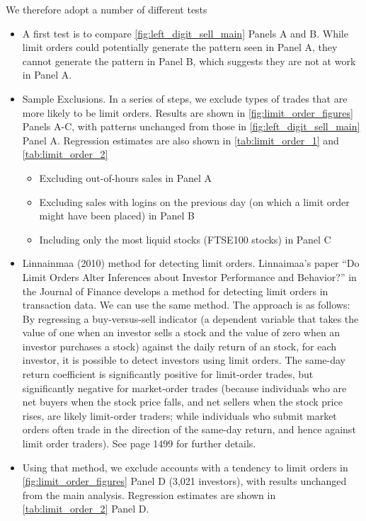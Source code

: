 We therefore adopt a number of different tests 
\begin{itemize}
	\item A first test is to compare \ref{fig:left_digit_sell_main} Panels A and B. While limit orders could potentially generate the pattern seen in Panel A, they cannot generate the pattern in Panel B, which suggests they are not at work in Panel A.
	\item Sample Exclusions. In a series of steps, we exclude types of trades that are more likely to be limit orders. Results are shown in \ref{fig:limit_order_figures} Panels A-C, with patterns unchanged from those in \ref{fig:left_digit_sell_main} Panel A. Regression estimates are also shown in \ref{tab:limit_order_1} and \ref{tab:limit_order_2}
	\begin{itemize}
		\item Excluding out-of-hours sales in Panel A
		\item Excluding sales with logins on the previous day (on which a limit order might have been placed) in Panel B
		\item Including only the most liquid stocks (FTSE100 stocks) in Panel C
	\end{itemize} 
	\item Linnainmaa (2010) method for detecting limit orders. Linnaimaa's paper ``Do Limit Orders Alter Inferences about Investor Performance and Behavior?'' in the Journal of Finance develops a method for detecting limit orders in transaction data. We can use the same method. The approach is as follows: By regressing a buy-versus-sell indicator (a dependent variable that takes the value of one when an investor sells a stock and the value of zero when an investor purchases a stock) against the daily return of an stock, for each investor, it is possible to detect investors using limit orders. The same-day return coefficient is significantly positive for limit-order trades, but significantly negative for market-order trades (because individuals who are net buyers when the stock price falls, and net sellers when the stock price rises, are likely limit-order traders; while individuals who submit market orders often trade in the direction of the same-day return, and hence against limit order traders). See page 1499 for further details.
	\item Using that method, we exclude accounts with a tendency to limit orders in \ref{fig:limit_order_figures} Panel D (3,021 investors), with results unchanged from the main analysis. Regression estimates are shown in \ref{tab:limit_order_2} Panel D.
\end{itemize}

